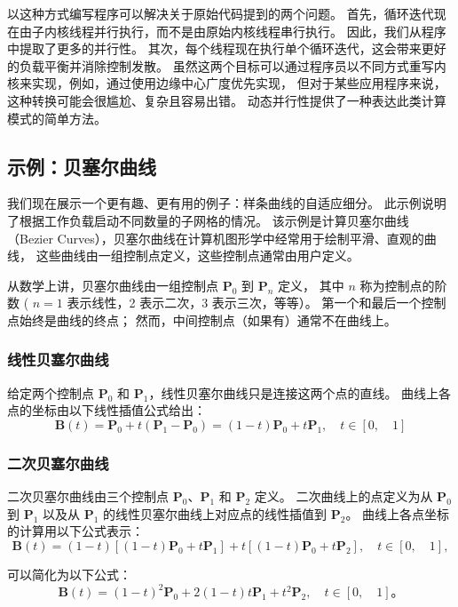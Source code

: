 以这种方式编写程序可以解决关于原始代码提到的两个问题。 
首先，循环迭代现在由子内核线程并行执行，而不是由原始内核线程串行执行。 因此，我们从程序中提取了更多的并行性。 
其次，每个线程现在执行单个循环迭代，这会带来更好的负载平衡并消除控制发散。 
虽然这两个目标可以通过程序员以不同方式重写内核来实现，例如，通过使用边缘中心广度优先实现，
但对于某些应用程序来说，这种转换可能会很尴尬、复杂且容易出错。 动态并行性提供了一种表达此类计算模式的简单方法。

\subsection{示例：贝塞尔曲线}
我们现在展示一个更有趣、更有用的例子：样条曲线的自适应细分。 此示例说明了根据工作负载启动不同数量的子网格的情况。 
该示例是计算贝塞尔曲线（Bezier Curves），贝塞尔曲线在计算机图形学中经常用于绘制平滑、直观的曲线，
这些曲线由一组控制点定义，这些控制点通常由用户定义。

从数学上讲，贝塞尔曲线由一组控制点 $\mathbf{P}_{0}$ 到 $\mathbf{P}_{n}$ 定义，
其中 $n$ 称为控制点的阶数 ( $n =1$ 表示线性，2 表示二次，3 表示三次，等等）。 
第一个和最后一个控制点始终是曲线的终点； 然而，中间控制点（如果有）通常不在曲线上。

\subsubsection{线性贝塞尔曲线}
给定两个控制点 $\mathbf{P}_{0}$ 和 $\mathbf{P}_{1}$，线性贝塞尔曲线只是连接这两个点的直线。 
曲线上各点的坐标由以下线性插值公式给出：
$$
\mathbf{B}(t)=\mathbf{P}_{0}+t\left(\mathbf{P}_{1}-\mathbf{P}_{0}\right)=(1-t ) \mathbf{P}_{0}+t \mathbf{P}_{1}, \quad t \in[0, \quad 1]
$$

\subsubsection{二次贝塞尔曲线}
二次贝塞尔曲线由三个控制点 $\mathbf{P}_{0}、\mathbf{P}_{1}$ 和 $\mathbf{P}_{2}$ 定义。 
二次曲线上的点定义为从 $\mathbf{P}_{0}$ 到 $\mathbf{P}_{1}$ 
以及从 $\mathbf{P}_{1}$ 的线性贝塞尔曲线上对应点的线性插值到 $\mathbf{P}_{2}$。 曲线上各点坐标的计算用以下公式表示：
$$
\mathbf{B}(t)=(1-t)\left[(1-t) \mathbf{P}_{0}+t \mathbf{P}_{1}\right]+t\left[ (1-t) \mathbf{P}_{0}+t \mathbf{P}_{2}\right], \quad t \in[0, \quad 1],
$$

可以简化为以下公式：
$$
\mathbf{B}(t)=(1-t)^{2} \mathbf{P}_{0}+2(1-t) t \mathbf{P}_{1}+t^{2} \mathbf{P}_{2}, \quad t \in[0, \quad 1] 。
$$

